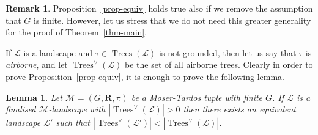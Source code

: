 \documentclass[12pt,a4paper]{article}
\numberwithin{equation}{section}
\newtheorem{lemma}[equation]{Lemma}
\theoremstyle{definition}
\newtheorem{remark}[equation]{Remark}
\newenvironment{myrem}{%
        \begin{mdframed}[%
            linewidth=4pt, 
            topline=false, 
            bottomline=false, 
            rightline=false,%
            leftmargin=0pt, 
            innerleftmargin=0.4em, 
            rightmargin=0pt, 
            innerrightmargin=0pt, 
            innertopmargin=0pt ,%
            innerbottommargin=0pt, 
            splittopskip=\topskip, 
            splitbottomskip=0.3\topskip, %
            ]%
        \begin{remark}
    }{%
        \end{remark}
        \end{mdframed}
    }
\renewcommand{\cal}[1]{{\mathcal #1}}
\newcommand{\Trees}{\operatorname{Trees}}
\begin{document}
    \begin{myrem} Proposition~\ref{prop-equiv} holds true also if we remove the assumption that $G$ is finite. However, let us stress that we do not need this greater generality for the proof of Theorem~\ref{thm-main}.
    \end{myrem}
    
    If $\cal L$ is a landscape and $\tau\in \Trees(\cal L)$ is not grounded, then let us say that $\tau$ is \emph{airborne}, and let $\Trees^\vee(\cal L)$ be the set of all airborne trees.
    Clearly in order to prove Proposition~\ref{prop-equiv},  it is enough to prove the following lemma.
    
    \begin{lemma}
    Let $\cal M = (G, \mathbf R,  \pi)$ be a Moser-Tardos tuple with finite $G$. If $\cal L$ is a finalised $\cal M$-landscape with
     $|\Trees^\vee(\cal L)|>0$ then there exists an equivalent landscape $\cal L'$ 
    such that  $|\Trees^\vee(\cal L')| < |\Trees^\vee(\cal L)|$.
    \end{lemma}
    
\end{document}

